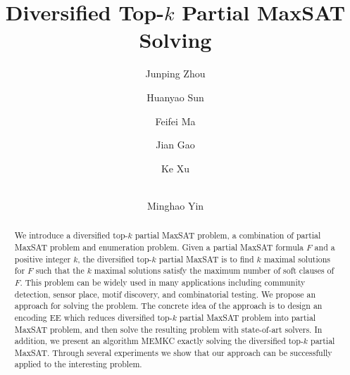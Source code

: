 \documentclass{llncs}
\begin{document}
\title{Diversified Top-$k$ Partial MaxSAT Solving}
\author{Junping Zhou \and Huanyao Sun \and Feifei Ma \and Jian Gao \and Ke Xu  \and \\Minghao Yin}
\maketitle
{}

\begin{abstract}
We introduce a diversified top-$k$ partial MaxSAT problem, a combination of partial MaxSAT problem and enumeration problem. Given a partial MaxSAT formula $F$ and a positive integer $k$, the diversified top-$k$ partial MaxSAT is to find $k$ maximal solutions for $F$ such that the $k$ maximal solutions satisfy the maximum number of soft clauses of $F$. This problem can be widely used in many applications including community detection, sensor place, motif discovery, and combinatorial testing. We propose an approach for solving the problem. The concrete idea of the approach is to design an encoding EE which reduces diversified top-$k$ partial MaxSAT problem into partial MaxSAT problem, and then solve the resulting problem with state-of-art solvers. In addition, we present an algorithm MEMKC exactly solving the diversified top-$k$ partial MaxSAT. Through several experiments we show that our approach can be successfully applied to the interesting problem.\\

\end{abstract}
\end{document}
